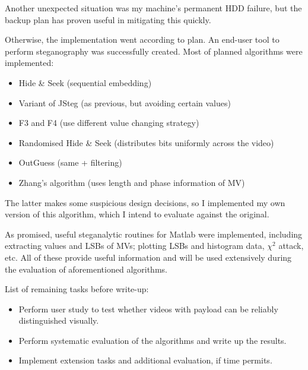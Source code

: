 \documentclass[11pt,british,usenames,dvipsnames,hypens,final]{scrartcl}
\numberwithin{equation}{section}
\numberwithin{figure}{section}
\begin{document}
Another unexpected situation was my machine's permanent HDD failure, but the backup plan has proven useful in mitigating this quickly. 

\newpage
Otherwise, the implementation went according to plan. An end-user tool to perform steganography was successfully created. Most of planned algorithms were implemented: 
\begin{multicols}{2}
\begin{itemize}
\item Hide \& Seek (sequential embedding)
\item Variant of JSteg (as previous, but avoiding certain values)
\item F3 and F4 (use different value changing strategy)
\item Randomised Hide \& Seek (distributes bits uniformly across the video)
\item OutGuess (same + filtering)
\item Zhang's algorithm (uses length and phase information of MV)
\end{itemize}
\end{multicols}

The latter makes some suspicious design decisions, so I implemented my own version of this algorithm, which I intend to evaluate against the original. 

As promised, useful steganalytic routines for Matlab were implemented, including extracting values and LSBs of MVs; plotting LSBs and histogram data, $\chi^2$ attack, etc. All of these provide useful information and will be used extensively during the evaluation of aforementioned algorithms.

List of remaining tasks before write-up:
\begin{itemize}
\item Perform user study to test whether videos with payload can be reliably distinguished visually. 
\item Perform systematic evaluation of the algorithms and write up the results.
\item Implement extension tasks and additional evaluation, if time permits.
\end{itemize} 
\end{document}
